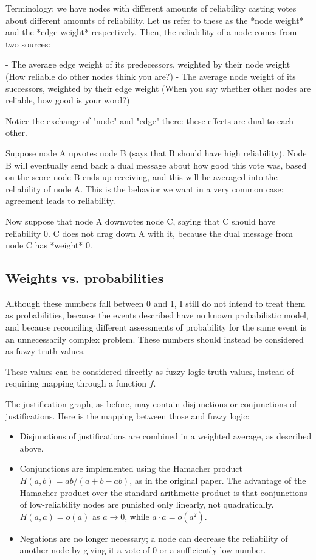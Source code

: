 Terminology: we have nodes with different amounts of reliability casting votes
about different amounts of reliability. Let us refer to these as the *node
weight* and the *edge weight* respectively. Then, the reliability of a node
comes from two sources:

- The average edge weight of its predecessors, weighted by their node weight
  (How reliable do other nodes think you are?)
- The average node weight of its successors, weighted by their edge weight
  (When you say whether other nodes are reliable, how good is your word?)

Notice the exchange of "node" and "edge" there: these effects are dual to each
other. 

Suppose node A upvotes node B (says that B should have high reliability). Node
B will eventually send back a dual message about how good this vote was, based
on the score node B ends up receiving, and this will be averaged into the
reliability of node A. This is the behavior we want in a very common case:
agreement leads to reliability.

Now suppose that node A downvotes node C, saying that C should have reliability
0. C does not drag down A with it, because the dual message from node C has
*weight* 0.

\subsection{Weights vs. probabilities}

Although these numbers fall between 0 and 1, I still do not intend to treat
them as probabilities, because the events described have no known probabilistic
model, and because reconciling different assessments of probability for the
same event is an unnecessarily complex problem. These numbers should instead be
considered as fuzzy truth values.

These values can be considered directly as fuzzy logic truth values, instead of
requiring mapping through a function $f$.

The justification graph, as before, may contain disjunctions or conjunctions of
justifications. Here is the mapping between those and fuzzy logic:

\begin{itemize}
\item Disjunctions of justifications are combined in a weighted average, as
described above.
\item Conjunctions are implemented using the Hamacher product $H(a, b) =
ab/(a+b-ab)$, as in the original paper. The advantage of the Hamacher product
over the standard arithmetic product is that conjunctions of low-reliability
nodes are punished only linearly, not quadratically. $H(a, a) = o(a)$ as $a
\rightarrow 0$, while $a \cdot a = o(a^2)$.
\item Negations are no longer necessary; a node can decrease the reliability of
another node by giving it a vote of 0 or a sufficiently low number.
\end{itemize}

